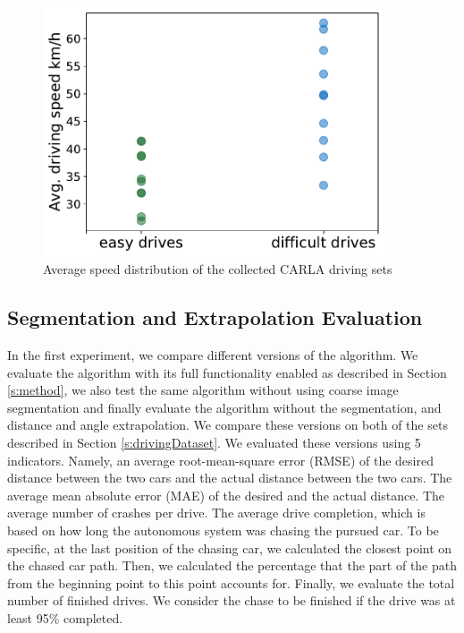 \documentclass{ctuthesis/ctuthesis}
\begin{document}
\begin{figure}[]
    \centering
    \includegraphics[width=0.9\textwidth]{images/average_speeds.pdf}
    
    \caption{Average speed distribution of the collected CARLA driving sets}\label{f:speed_distribution}
\end{figure}



\subsection{Segmentation and Extrapolation Evaluation} \label{s:experiment1}
In the first experiment, we compare different versions of the algorithm. We evaluate the algorithm with its full functionality enabled as described in Section \ref{s:method}, we also test the same algorithm without using coarse image segmentation and finally evaluate the algorithm without the segmentation, and distance and angle extrapolation. We compare these versions on both of the sets described in Section \ref{s:drivingDataset}. We evaluated these versions using 5 indicators. Namely, an average root-mean-square error (RMSE) of the desired distance between the two cars and the actual distance between the two cars. The average mean absolute error (MAE) of the desired and the actual distance. The average number of crashes per drive. The average drive completion, which is based on how long the autonomous system was chasing the pursued car. To be specific, at the last position of the chasing car, we calculated the closest point on the chased car path. Then, we calculated the percentage that the part of the path from the beginning point to this point accounts for. Finally, we evaluate the total number of finished drives. We consider the chase to be finished if the drive was at least 95\% completed.\par
\end{document}
